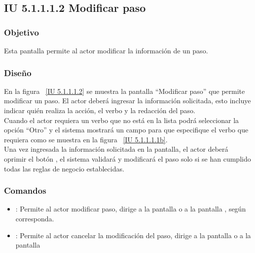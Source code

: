 \newpage 
\subsection{IU 5.1.1.1.2 Modificar paso}

\subsubsection{Objetivo}
	
	Esta pantalla permite al actor modificar la información de un paso.

\subsubsection{Diseño}

    En la figura ~\ref{IU 5.1.1.1.2} se muestra la pantalla ``Modificar paso'' que permite modificar un paso. El actor deberá ingresar la información solicitada, 
    esto incluye indicar quién realiza la acción, el verbo y la redacción del paso.\\
    
    Cuando el actor requiera un verbo que no está en la lista podrá seleccionar la opción ``Otro'' y el sistema mostrará un campo para 
    que especifique el verbo que requiera como se muestra en la figura ~\ref{IU 5.1.1.1.1b}. \\
    
    
    Una vez ingresada la información solicitada en la pantalla, el actor deberá oprimir el botón 
    , el sistema validará y modificará el paso solo si se han cumplido todas las reglas de negocio establecidas.  \\




\subsubsection{Comandos}
\begin{itemize}
	\item {}: Permite al actor modificar paso, dirige a la pantalla  o a la pantalla , según corresponda.
	\item {}: Permite al actor cancelar la modificación del paso, dirige a la pantalla  o a la pantalla 
\end{itemize}

